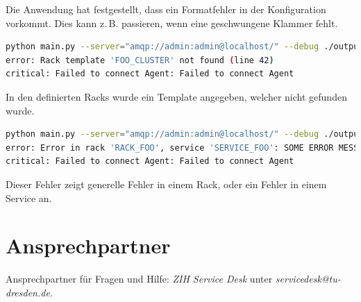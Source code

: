 \noindent
Die Anwendung hat festgestellt, dass ein Formatfehler in der Konfiguration vorkommt.
Dies kann z.\,B. passieren, wenn eine geschwungene Klammer fehlt.

\begin{lstlisting}[language=bash, caption=Rack Template nicht gefunden, label=lst:error-rack]
python main.py --server="amqp://admin:admin@localhost/" --debug ./output
error: Rack template 'FOO_CLUSTER' not found (line 42)
critical: Failed to connect Agent: Failed to connect Agent
\end{lstlisting}

\noindent
In den definierten Racks wurde ein Template angegeben, welcher nicht gefunden wurde.

\begin{lstlisting}[language=bash, caption=Generelle Konfigurationsfehler, label=lst:error-rack2]
python main.py --server="amqp://admin:admin@localhost/" --debug ./output
error: Error in rack 'RACK_FOO', service 'SERVICE_FOO': SOME ERROR MESSAGE
critical: Failed to connect Agent: Failed to connect Agent
\end{lstlisting}

\noindent
Dieser Fehler zeigt generelle Fehler in einem Rack, oder ein Fehler in einem Service an.

\section{Ansprechpartner}\label{sec:contact}
Ansprechpartner für Fragen und Hilfe: \textit{ZIH Service Desk} unter \textit{servicedesk@tu-dresden.de}.
